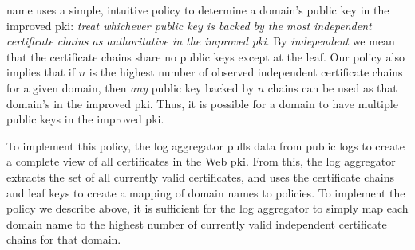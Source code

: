 \ac{name} uses a simple, intuitive policy to determine a domain's public key in
the improved \ac{pki}: \emph{treat whichever public key is backed by the most
independent certificate chains as authoritative in the improved \ac{pki}}. By
\emph{independent} we mean that the certificate chains share no public keys
except at the leaf. Our policy also implies that if $n$ is the highest number of
observed independent certificate chains for a given domain, then \emph{any}
public key backed by $n$ chains can be used as that domain's in the improved
\ac{pki}. Thus, it is possible for a domain to have multiple public keys in the
improved \ac{pki}.

To implement this policy, the log aggregator pulls data from public logs to
create a complete view of all certificates in the Web \ac{pki}. From this, the
log aggregator extracts the set of all currently valid certificates, and uses
the certificate chains and leaf keys to create a mapping of domain names to
policies. To implement the policy we describe above, it is sufficient for the
log aggregator to simply map each domain name to the highest number of currently
valid independent certificate chains for that domain.



